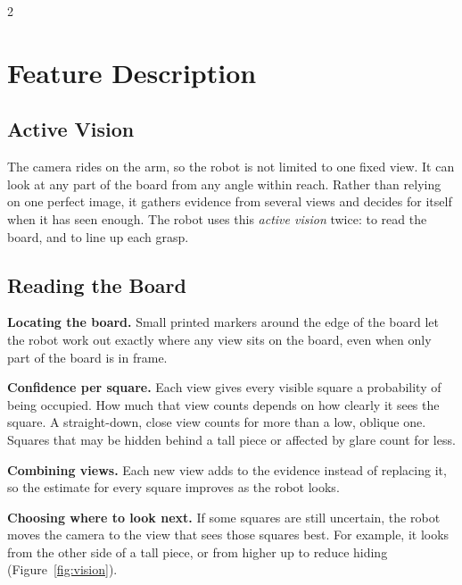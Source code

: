 \documentclass[10pt,a4paper]{article}
\begin{document}
\clearpage
\begin{multicols}{2}
\section{Feature Description}

\subsection{Active Vision}
The camera rides on the arm, so the robot is not limited to one fixed view. It can look at any
part of the board from any angle within reach. Rather than relying on one perfect image, it
gathers evidence from several views and decides for itself when it has seen enough.
The robot uses this \emph{active vision} twice: to read the board, and to line up each grasp.

\subsection{Reading the Board}
\textbf{Locating the board.} Small printed markers around the edge of the board let the robot
work out exactly where any view sits on the board, even when only part of the board is in frame.

\textbf{Confidence per square.} Each view gives every visible square a probability of being
occupied. How much that view counts depends on how clearly it sees the square. A straight-down,
close view counts for more than a low, oblique one. Squares that may be hidden behind a tall
piece or affected by glare count for less.

\textbf{Combining views.} Each new view adds to the evidence instead of replacing it, so the
estimate for every square improves as the robot looks.

\textbf{Choosing where to look next.} If some squares are still uncertain, the robot moves the camera
to the view that sees those squares best. For example, it looks from the other side of a tall
piece, or from higher up to reduce hiding (Figure~\ref{fig:vision}).


\end{multicols}
\end{document}
